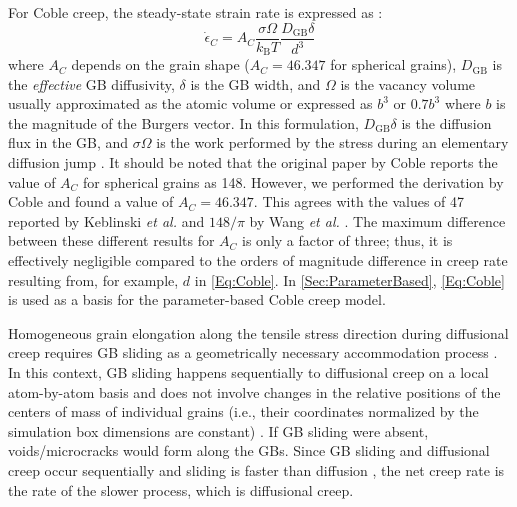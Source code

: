 \documentclass[preprint,12pt,sort&compress]{elsarticle} %
\newcommand{\?}{\stackrel{?}{=}}
\providecommand{\DIFaddbegin}{\protect\color{blue}} %
\providecommand{\DIFaddend}{\protect\color{black}} %
\providecommand{\DIFdelbegin}{\protect\color{red}} %
\providecommand{\DIFdelend}{\protect\color{black}} %
\newcommand{\DIFscaledelfig}{0.5}
\newlength{\DIFdelgraphicswidth} %
\newlength{\DIFdelgraphicsheight} %
\newcommand{\DIFaddincludegraphics}[2][]{{\color{blue}\fbox{\DIFOincludegraphics[#1]{#2}}}} %
\newcommand{\DIFdelincludegraphics}[2][]{%
\sbox{\DIFdelgraphicsbox}{\DIFOincludegraphics[#1]{#2}}%
\settoboxwidth{\DIFdelgraphicswidth}{\DIFdelgraphicsbox} %
\settoboxtotalheight{\DIFdelgraphicsheight}{\DIFdelgraphicsbox} %
\scalebox{\DIFscaledelfig}{%
\parbox[b]{\DIFdelgraphicswidth}{\usebox{\DIFdelgraphicsbox}\\[-\baselineskip] \rule{\DIFdelgraphicswidth}{0em}}\llap{\resizebox{\DIFdelgraphicswidth}{\DIFdelgraphicsheight}{%
\setlength{\unitlength}{\DIFdelgraphicswidth}%
\begin{picture}(1,1)%
\thicklines\linethickness{2pt} %
{\color[rgb]{1,0,0}\put(0,0){\framebox(1,1){}}}%
{\color[rgb]{1,0,0}\put(0,0){\line( 1,1){1}}}%
{\color[rgb]{1,0,0}\put(0,1){\line(1,-1){1}}}%
\end{picture}%
}\hspace*{3pt}}} %
} %
\DeclareRobustCommand{\DIFaddbegin}{\DIFOaddbegin \let\includegraphics\DIFaddincludegraphics} %
\DeclareRobustCommand{\DIFaddend}{\DIFOaddend \let\includegraphics\DIFOincludegraphics} %
\DeclareRobustCommand{\DIFdelbegin}{\DIFOdelbegin \let\includegraphics\DIFdelincludegraphics} %
\DeclareRobustCommand{\DIFdelend}{\DIFOaddend \let\includegraphics\DIFOincludegraphics} %
\begin{document}
For Coble creep, the steady-state strain rate is expressed as \cite{Coble1963, Courtney2005}:
\DIFdelbegin %
\DIFdelend \DIFaddbegin \begin{equation}
\Dot{\epsilon}_C = A_C \frac{\sigma \Omega}{k_\mathrm{B} T} \frac{ D_{\mathrm{GB}} \delta }{d^3} 
\label{Eq:Coble}
\end{equation}\DIFaddend 
where $A_C$ depends on the grain shape ($A_C = 46.347$ for spherical grains), $D_{\mathrm{GB}}$ is the \textit{effective} GB diffusivity, $\delta$ is the GB width, and $\Omega$ is the vacancy volume usually approximated as the atomic volume or expressed as $b^3$ \cite{Mukherjee2002} or $0.7b^3$ \cite{Meyers2009} where $b$ is the magnitude of the Burgers vector. In this formulation, $D_{\mathrm{GB}} \delta$ is the diffusion flux in the GB, and $\sigma \Omega$ is the work performed by the stress during an elementary diffusion jump \cite{Keblinski1998, Yamakov2002}. It should be noted that the original paper by Coble \cite{Coble1963} reports the value of $A_C$ for spherical grains as 148. However, we performed the derivation by Coble and found a value of $A_C = 46.347$. This agrees with the values of 47 reported by Keblinski \textit{et al.} \cite{Keblinski1998} and $148/\pi$ by Wang \textit{et al.} \cite{Wang2011}. The maximum difference between these different results for $A_C$ is only a factor of three; thus, it is effectively negligible compared to the orders of magnitude difference in creep rate resulting from, for example, $d$ in \cref{Eq:Coble}. In \cref{Sec:ParameterBased}, \cref{Eq:Coble} is used as a basis for the parameter-based Coble creep model.

Homogeneous grain elongation along the tensile stress direction during diffusional creep requires GB sliding as a geometrically necessary accommodation process \cite{Yamakov2002, Courtney2005}. In this context, GB sliding happens sequentially to diffusional creep on a local atom-by-atom basis and does not involve changes in the relative positions of the centers of mass of individual grains (i.e., their coordinates normalized by the simulation box dimensions are constant) \cite{Courtney2005}. If GB sliding were absent, voids/microcracks would form along the GBs. Since GB sliding and diffusional creep occur sequentially and sliding is faster than diffusion \cite{Courtney2005}, the net creep rate is the rate of the slower process, which is diffusional creep.
\end{document}

